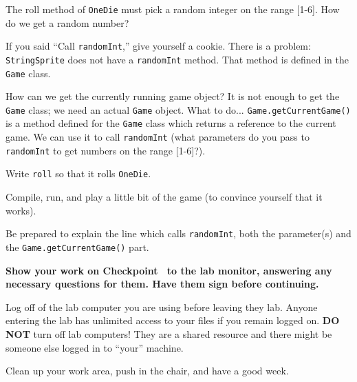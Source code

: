 \documentclass[12pt,twoside]{memoir}
\newcommand\code[1]{\lstinline^#1^}
\newenvironment{Checkpoint}[1]{%
\begin{Exercise}[name={Checkpoint},title={#1}]}{%
\end{Exercise}%
\textbf{Show your work on Checkpoint~\theExercise{} to the lab monitor, %
  answering any necessary questions for them.  Have them sign before continuing.}}
\begin{document}
\begin{Checkpoint}{Roll the Dice}
  The roll method of \code{OneDie} must pick a random integer on the
  range [1-6]. How do we get a random number?

  If you said ``Call \code{randomInt},'' give yourself a cookie. There
  is a problem: \code{StringSprite} does not have a \code{randomInt}
  method. That method is defined in the \code{Game} class.

  How can we get the currently running game object? It is not enough
  to get the \code{Game} class; we need an actual \code{Game}
  object. What to do... \code{Game.getCurrentGame()} is a method
  defined for the \code{Game} class which returns a reference to the
  current game. We can use it to call \code{randomInt} (what
  parameters do you pass to \code{randomInt} to get numbers on the
  range [1-6]?). 

  Write \code{roll} so that it rolls \code{OneDie}. 

  Compile, run, and play a little bit of the game (to convince
  yourself that it works). 

  Be prepared to explain the line which calls \code{randomInt}, both
  the parameter(s) and the \code{Game.getCurrentGame()} part.
\end{Checkpoint}

\Large{Log off of the lab computer you are using before leaving they
  lab. Anyone entering the lab has unlimited access to your files if
  you remain logged on. \textbf{DO NOT} turn off lab computers! They
  are a shared resource and there might be someone else logged in to
  ``your'' machine.}

\Large{Clean up your work area, push in the chair, and have a good
  week.}
\end{document}
